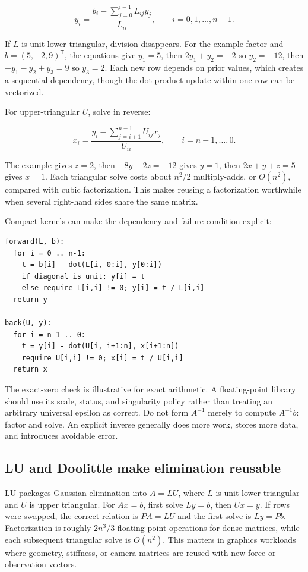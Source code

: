 \[
y_i=\frac{b_i-\sum_{j=0}^{i-1}L_{ij}y_j}{L_{ii}},\qquad i=0,1,\ldots,n-1.
\]

If \(L\) is unit lower triangular, division disappears. For the example factor and \(b=(5,-2,9)^\mathsf T\), the equations give \(y_1=5\), then \(2y_1+y_2=-2\) so \(y_2=-12\), then \(-y_1-y_2+y_3=9\) so \(y_3=2\). Each new row depends on prior values, which creates a sequential dependency, though the dot-product update within one row can be vectorized.

For upper-triangular \(U\), solve in reverse:

\[
x_i=\frac{y_i-\sum_{j=i+1}^{n-1}U_{ij}x_j}{U_{ii}},\qquad i=n-1,\ldots,0.
\]

The example gives \(z=2\), then \(-8y-2z=-12\) gives \(y=1\), then \(2x+y+z=5\) gives \(x=1\). Each triangular solve costs about \(n^2/2\) multiply-adds, or \(O(n^2)\), compared with cubic factorization. This makes reusing a factorization worthwhile when several right-hand sides share the same matrix.

Compact kernels can make the dependency and failure condition explicit:

\begin{verbatim}
forward(L, b):
  for i = 0 .. n-1:
    t = b[i] - dot(L[i, 0:i], y[0:i])
    if diagonal is unit: y[i] = t
    else require L[i,i] != 0; y[i] = t / L[i,i]
  return y

back(U, y):
  for i = n-1 .. 0:
    t = y[i] - dot(U[i, i+1:n], x[i+1:n])
    require U[i,i] != 0; x[i] = t / U[i,i]
  return x
\end{verbatim}

The exact-zero check is illustrative for exact arithmetic. A floating-point library should use its scale, status, and singularity policy rather than treating an arbitrary universal epsilon as correct. Do not form \(A^{-1}\) merely to compute \(A^{-1}b\): factor and solve. An explicit inverse generally does more work, stores more data, and introduces avoidable error.

\subsection{LU and Doolittle make elimination reusable}\label{01-foundations-i-ch019-lu-and-doolittle-make-elimination-reusable}

\hypertarget{01-foundations-i-ch019-lu-and-doolittle-make-elimination-reusable}{}

LU packages Gaussian elimination into \(A=LU\), where \(L\) is unit lower triangular and \(U\) is upper triangular. For \(Ax=b\), first solve \(Ly=b\), then \(Ux=y\). If rows were swapped, the correct relation is \(PA=LU\) and the first solve is \(Ly=Pb\). Factorization is roughly \(2n^3/3\) floating-point operations for dense matrices, while each subsequent triangular solve is \(O(n^2)\). This matters in graphics workloads where geometry, stiffness, or camera matrices are reused with new force or observation vectors.

